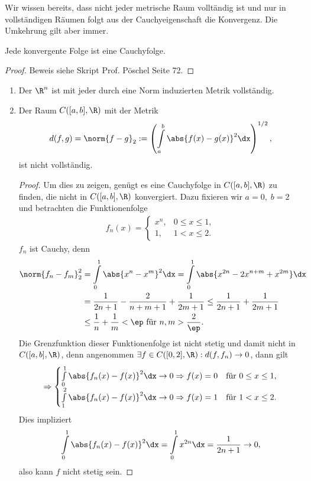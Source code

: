 Wir wissen bereits, dass nicht jeder metrische Raum volltändig ist und nur in
vollständigen Räumen folgt aus der Cauchyeigenschaft die Konvergenz. Die
Umkehrung gilt aber immer.

\begin{propn}
Jede konvergente Folge ist eine Cauchyfolge.\fishhere
\end{propn}
\begin{proof}
Beweis siehe Skript Prof. Pöschel Seite 72.\qedhere
\end{proof}

\begin{bsp}
\label{bsp:1.5}
\begin{enumerate}
\item Der $\R^n$ ist mit jeder durch eine Norm induzierten Metrik
vollständig.
\item Der Raum $C([a,b],\R)$ mit der Metrik
\begin{align*}
d(f,g) = \norm{f-g}_2 := \left( \int\limits_a^b \abs{f(x)-g(x)}^2 \dx
\right)^{1/2},
\end{align*}
ist nicht vollständig.
\begin{proof}
Um dies zu zeigen, genügt es eine Cauchyfolge in $C([a,b],\R)$ zu finden, die
nicht in $C([a,b],\R)$ konvergiert. Dazu fixieren wir $a=0,\;b=2$ und betrachten
die Funktionenfolge
\begin{align*}
f_n(x) =\begin{cases}x^n, & 0\le x\le 1,\\ 1, & 1<x\le 2.\end{cases}
\end{align*}
$f_n$ ist Cauchy, denn
\begin{align*}
\norm{f_n-f_m}_2^2 &= \int\limits_0^1 \abs{x^n-x^m}^2\dx = \int\limits_0^1
\abs{x^{2n}-2x^{n+m}+x^{2m}}\dx
\\ &= \frac{1}{2n+1} - \frac{2}{n+m+1} + \frac{1}{2m+1} \le \frac{1}{2n+1}+
\frac{1}{2m+1} \\& \le \frac{1}{n}+\frac{1}{m} < \ep \text{ für } n,m >
\frac{2}{\ep}.
\end{align*}
Die Grenzfunktion dieser Funktionenfolge ist nicht stetig und damit nicht in
$C([a,b],\R)$, denn angenommen $\exists f\in C([0,2],\R) : d(f,f_n) \to 0$,
dann gilt
\begin{align*}
\Rightarrow \begin{cases} \int\limits_0^1 \abs{f_n(x)-f(x)}^2 \dx \to 0
\Rightarrow f(x) = 0 & \text{für } 0\le x\le 1,\\
\int\limits_1^2 \abs{f_n(x)-f(x)}^2 \dx \to 0
\Rightarrow f(x) = 1 & \text{für } 1< x\le 2.\\
\end{cases}
\end{align*}
Dies impliziert
\begin{align*}
\int\limits_0^1 \abs{f_n(x)-f(x)}^2 \dx = \int\limits_0^1 x^{2n}
\dx = \frac{1}{2n+1} \to 0,
\end{align*}
also kann $f$ nicht stetig sein.\qedhere\bsphere
\end{proof}
\end{enumerate}
\end{bsp}

